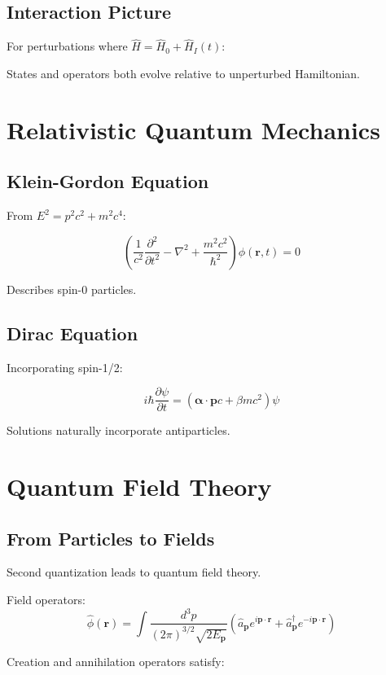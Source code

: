 \documentclass[12pt]{article}
\begin{document}
\subsection{Interaction Picture}

For perturbations where $\hat{H} = \hat{H}_0 + \hat{H}_I(t)$:

States and operators both evolve relative to unperturbed Hamiltonian.

\section{Relativistic Quantum Mechanics}

\subsection{Klein-Gordon Equation}

From $E^2 = p^2c^2 + m^2c^4$:

\[
\left(\frac{1}{c^2}\frac{\partial^2}{\partial t^2} - \nabla^2 + \frac{m^2c^2}{\hbar^2}\right)\phi(\mathbf{r},t) = 0
\]

Describes spin-0 particles.

\subsection{Dirac Equation}

Incorporating spin-1/2:

\[
i\hbar\frac{\partial\psi}{\partial t} = (\boldsymbol{\alpha} \cdot \mathbf{p}c + \beta mc^2)\psi
\]

Solutions naturally incorporate antiparticles.

\section{Quantum Field Theory}

\subsection{From Particles to Fields}

Second quantization leads to quantum field theory.

Field operators:
\[
\hat{\phi}(\mathbf{r}) = \int \frac{d^3p}{(2\pi)^{3/2}\sqrt{2E_\mathbf{p}}}(\hat{a}_\mathbf{p}e^{i\mathbf{p}\cdot\mathbf{r}} + \hat{a}_\mathbf{p}^\dagger e^{-i\mathbf{p}\cdot\mathbf{r}})
\]

Creation and annihilation operators satisfy:
\end{document}
